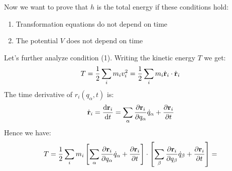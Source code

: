 Now we want to prove that $h$ is the total energy if these conditions hold:
\begin{enumerate}
    \item Transformation equations do not depend on time
    \item The potential $V$ does not depend on time
\end{enumerate}
Let's further analyze condition (1). Writing the kinetic energy $T$ we get:
\begin{equation}
    T = \dfrac{1}{2}\displaystyle\sum_i m_i v_i^2 = \dfrac{1}{2}\displaystyle\sum_i m_i \dot{\vb{r}}_i \cdot \dot{\vb{r}}_i
\end{equation}
The time derivative of $r_i(q_{\alpha},t)$ is:
\begin{equation}
    \dvec{r}_i = \dfrac{\dd{\vec{r}_i}}{\dd{t}} = \bigsum_{\alpha}\pdv{ \vec{r}_i}{ q_{\alpha}}\dot{q}_{\alpha} + \pdv{ \vec{r}_i}{ t}
\end{equation}
Hence we have:
\begin{equation}
    T = \dfrac{1}{2}\bigsum_i m_i \sqbr{\bigsum_{\alpha}\pdv{ \vec{r}_i}{ q_{\alpha}}\dot{q}_{\alpha} + \pdv{ \vec{r}_i}{ t}} \cdot \sqbr{\bigsum_{\beta}\pdv{ \vec{r}_i}{ q_{\beta}}\dot{q}_{\beta} + \pdv{ \vec{r}_i}{ t}} =
\end{equation}

